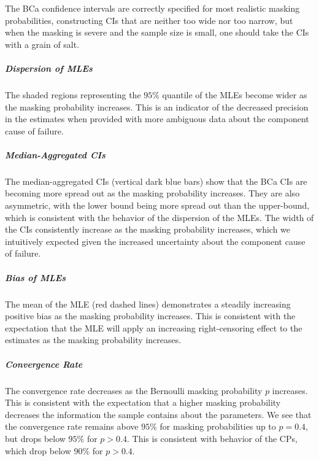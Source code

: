 \documentclass[
]{article}
\theoremstyle{definition}
\theoremstyle{plain}
\theoremstyle{definition}
\theoremstyle{definition}
\theoremstyle{definition}
\theoremstyle{definition}
\theoremstyle{remark}
\begin{document}
The BCa confidence intervals are correctly specified for most realistic masking
probabilities, constructing CIs that are neither too wide nor too narrow, but
when the masking is severe and the sample size is small, one should take the CIs
with a grain of salt.

\hypertarget{dispersion-of-mles-1}{%
\subparagraph*{Dispersion of MLEs}\label{dispersion-of-mles-1}}

The shaded regions representing the \(95\%\) quantile of the MLEs become wider as
the masking probability increases. This is an indicator of the decreased
precision in the estimates when provided with more ambiguous data about the
component cause of failure.

\hypertarget{median-aggregated-cis-1}{%
\subparagraph*{Median-Aggregated CIs}\label{median-aggregated-cis-1}}

The median-aggregated CIs (vertical dark blue bars) show that the BCa CIs are
becoming more spread out as the masking probability increases. They are also
asymmetric, with the lower bound being more spread out than the upper-bound,
which is consistent with the behavior of the dispersion of the MLEs. The width
of the CIs consistently increase as the masking probability increases, which we
intuitively expected given the increased uncertainty about the component cause
of failure.

\hypertarget{bias-of-mles-1}{%
\subparagraph*{Bias of MLEs}\label{bias-of-mles-1}}

The mean of the MLE (red dashed lines) demonstrates a steadily increasing
positive bias as the masking probability increases. This is consistent with the
expectation that the MLE will apply an increasing right-censoring effect to the
estimates as the masking probability increases.

\hypertarget{convergence-rate-1}{%
\subparagraph*{Convergence Rate}\label{convergence-rate-1}}

The convergence rate decreases as the Bernoulli masking probability \(p\)
increases. This is consistent with the expectation that a higher masking
probability decreases the information the sample contains about the
parameters. We see that the convergence rate remains above \(95\%\) for masking
probabilities up to \(p = 0.4\), but drops below \(95\%\) for \(p > 0.4\). This is
consistent with behavior of the CPs, which drop below \(90\%\) for \(p > 0.4\).
\end{document}

